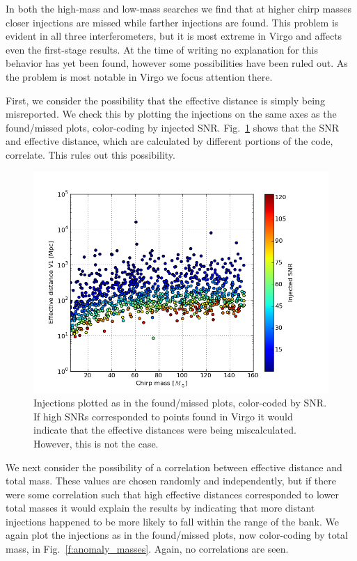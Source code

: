 In both the high-mass and low-mass searches we find that at higher
chirp masses closer injections are missed while farther injections are
found.  This problem is evident in all three interferometers, but it
is most extreme in Virgo and affects even the first-stage results.  At
the time of writing no explanation for this behavior has yet been
found, however some possibilities have been ruled out.  As the problem
is most notable in Virgo we focus attention there.

First, we consider the possibility that the effective distance is
simply being misreported.  We check this by plotting the injections on
the same axes as the found/missed plots, color-coding by injected SNR.
Fig.~\ref{f:anomaly_snrs} shows that the SNR
and effective distance, which are calculated by different portions of
the code, correlate.  This rules out this possibility.

\begin{figure}
  \includegraphics[width=\linewidth]{figures/ninja2_results/anomaly_snrs}
  \caption[Injections color-coded by SNR]{
  \label{f:anomaly_snrs}
Injections plotted as in the found/missed plots, color-coded by SNR.
If high SNRs corresponded to points found in Virgo it would indicate
that the effective distances were being miscalculated.  However, this
is not the case.
}
\end{figure}%

We next consider the possibility of a correlation between effective
distance and total mass.  These values are chosen randomly and
independently, but if there were some correlation such that high
effective distances corresponded to lower total masses it would
explain the results by indicating that more distant injections
happened to be more likely to fall within the range of the bank.
We again plot the injections as in the found/missed plots, now
color-coding by total mass, in Fig.~\ref{f:anomaly_masses}.  Again,
no correlations are seen.


